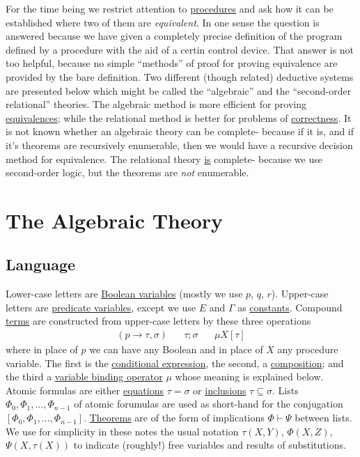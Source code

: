 \documentclass{article}
\begin{document}
For the time being we restrict attention to \underline{procedures} and ask how it can be established where two of them are \textit{equivalent}. In one sense the question is answered because we have given a completely precise definition of the program defined by a procedure with the aid of a certin control device. That answer is not too helpful, because no simple ``methods'' of proof for proving equivalence are provided by the bare definition. Two different (though related) deductive systems are presented below which might be called the ``algebraic'' and the ``second-order relational'' theories. The algebraic method is more efficient for proving \underline{equivalences}; while the relational method is better for problems of \underline{correctness}. It is not known whether an algebraic theory can be complete- because if it is, and if it's theorems are recursively enumerable, then we would have a recursive decision method for equivalence. The relational theory \underline{is} complete- because we use second-order logic, but the theorems are \textit{not} enumerable.  

\section{The Algebraic Theory}
\subsection{Language}
Lower-case letters are \underline{Boolean variables} (mostly we use $p$, $q$, $r$). Upper-case letters are \underline{predicate variables}, except we use $E$ and $\Gamma$ as \underline{constants}. Compound \underline{terms} are constructed from upper-case letters by these three operations
\begin{align*}
    (p \to \tau, \sigma) \hspace{20pt} \tau; \sigma \hspace{20pt} \mu X [\tau] 
\end{align*}
where in place of $p$ we can have any Boolean and in place of $X$ any procedure variable. The first is the \underline{conditional expression}, the second, a \underline{composition}; and the third a \underline{variable binding operator} $\mu$ whose meaning is explained below. Atomic formulas are either \underline{equations} $\tau = \sigma$ or \underline{inclusions} $\tau \subseteq \sigma$. Lists $\Phi_0, \Phi_1, \ldots, \Phi_{n-1}$ of atomic forumulas are used as short-hand for the conjugation $[\Phi_0, \Phi_1, \ldots, \Phi_{n-1}]$. \underline{Theorems} are of the form of implications $\Phi \vdash \Psi$ between lists. We use for simplicity in these notes the usual notation $\tau(X, Y)$, $\Phi(X, Z)$, $\Psi(X, \tau(X))$ to indicate (roughly!) free variables and results of substitutions. 
\end{document}
